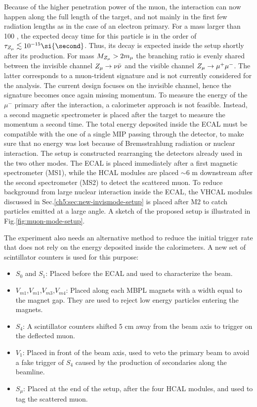 Because of the higher penetration power of the muon, the interaction can now happen along the full length of the target, and not mainly in the first few radiation lengths as in the case of an electron primary.
For a mass larger than 100 \mev, the expected decay time for this particle is in the order of $\tau_{\DMU} \lesssim 10^{-15} \si{\second}$. Thus, its decay is expected inside the setup shortly after its production. For mass $M_{Z_{\mu}} > 2 m_{\mu}$ the branching ratio is evenly shared between the invisible channel $Z_{\mu} \to \nu \bar{\nu}$ and the visible channel $Z_{\mu} \to \mu^+ \mu^-$. The latter corresponds to a muon-trident signature and is not currently considered for the analysis. The current design focuses on the invisible channel, hence the signature becomes once again missing momentum. To measure the energy of the $\mu^-$ primary after the interaction, a calorimeter approach is not feasible. Instead, a second magnetic spectrometer is placed after the target to measure the momentum a second time. The total energy deposited inside the ECAL must be compatible with the one of a single MIP passing through the detector, to make sure that no energy was lost because of Bremsstrahlung radiation or nuclear interaction. The setup is constructed rearranging the detectors already used in the two other modes. The ECAL is placed immediately after a first magnetic spectrometer (MS1), while the HCAL modules are placed $\sim$6 \si{\meter} downstream after the second spectrometer (MS2) to detect the scattered muon. To reduce background from large nuclear interaction inside the ECAL, the VHCAL modules discussed in Sec.\ref{ch5:sec:new-invismode-setup} is placed after M2 to catch particles emitted at a large angle. A sketch of the proposed setup is illustrated in Fig.\ref{fig:muon-mode-setup}.

The experiment also needs an alternative method to reduce the initial trigger rate that does not rely on the energy deposited inside the calorimeters. A new set of scintillator counters is used for this purpose:
\begin{itemize}
\item $S_0$ and $S_1$: Placed before the ECAL and used to characterize the beam.
\item $V_{m1}$,$V_{m1}$,$V_{m3}$,$V_{m4}$: Placed along each MBPL magnets with a width equal to the magnet gap. They are used to reject low energy particles entering the magnets.
\item $S_4$: A scintillator counters shifted 5 \si{\centi\meter} away from the beam axis to trigger on the deflected muon.
\item $V_1$: Placed in front of the beam axis, used to veto the primary beam to avoid a fake trigger of $S_4$ caused by the production of secondaries along the beamline.
\item $S_{\mu}$: Placed at the end of the setup, after the four HCAL modules, and used to tag the scattered muon.
\end{itemize}

